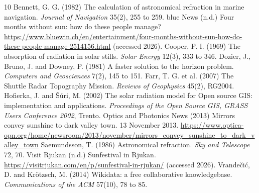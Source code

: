 \documentclass[11pt,a4paper]{article}
\begin{document}
\begin{thebibliography}{10}
 Bennett, G. G. (1982) The calculation of astronomical refraction in marine navigation. \textit{Journal of Navigation} 35(2), 255 to 259.
 blue News (n.d.) Four months without sun: how do these people manage? \url{https://www.bluewin.ch/en/entertainment/four-months-without-sun-how-do-these-people-manage-2514156.html} (accessed 2026).
 Cooper, P. I. (1969) The absorption of radiation in solar stills. \textit{Solar Energy} 12(3), 333 to 346.
 Dozier, J., Bruno, J. and Downey, P. (1981) A faster solution to the horizon problem. \textit{Computers and Geosciences} 7(2), 145 to 151.
 Farr, T. G. et al. (2007) The Shuttle Radar Topography Mission. \textit{Reviews of Geophysics} 45(2), RG2004.
 Hofierka, J. and \v{S}\'uri, M. (2002) The solar radiation model for Open source GIS: implementation and applications. \textit{Proceedings of the Open Source GIS, GRASS Users Conference 2002}, Trento.
 Optics and Photonics News (2013) Mirrors convey sunshine to dark valley town. 13 November 2013. \url{https://www.optica-opn.org/home/newsroom/2013/november/mirrors_convey_sunshine_to_dark_valley_town}
 Saemundsson, T. (1986) Astronomical refraction. \textit{Sky and Telescope} 72, 70.
 Visit Rjukan (n.d.) Sunfestival in Rjukan. \url{https://visitrjukan.com/en/p/sunfestival-in-rjukan/} (accessed 2026).
 Vrande\v{c}i\'c, D. and Kr\"otzsch, M. (2014) Wikidata: a free collaborative knowledgebase. \textit{Communications of the ACM} 57(10), 78 to 85.
\end{thebibliography}
\end{document}
